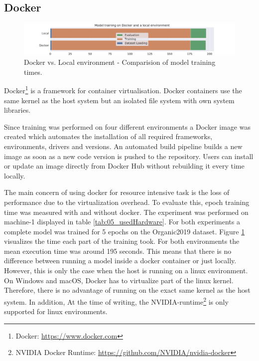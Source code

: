 \subsection{Docker}
\begin{figure}[ht]
	\centering
	\includegraphics[width=\textwidth]{figures/05_setup/05_dockerExecution}
	\caption{Docker vs. Local environment - Comparision of model training times.}
	\label{fig:05_dockerExecution}
\end{figure}

Docker\footnote{Docker: \url{https://www.docker.com}} is a framework for container virtualisation. Docker containers use the same kernel as the host system but an isolated file system with own system libraries. 
\medskip

Since training was performed on four different environments a Docker image was created which automates the installation of all required frameworks, environments, drivers and versions. An automated build pipeline builds a new image as soon as a new code version is pushed to the repository. Users can install or update an image directly from Docker Hub without rebuilding it every time locally.
\medskip

The main concern of using docker for resource intensive task is the loss of performance due to the virtualization overhead. To evaluate this, epoch training time was measured with and without docker. The experiment was performed on machine-1 displayed in table \ref{tab:05_usedHardware}. For both experiments a complete model was trained for 5 epochs on the Organic2019 dataset. Figure \ref{fig:05_dockerExecution} visualizes the time each part of the training took. For both environments the mean execution time was around 195 seconds. This means that there is no difference between running a model inside a docker container or just locally. However, this is only the case when the host is running on a linux environment. On Windows and macOS, Docker has to virtualize part of the linux kernel. Therefore, there is no advantage of running on the exact same kernel as the host system. In addition, At the time of writing, the NVIDIA-runtime\footnote{NVIDIA Docker Runtime: \url{https://github.com/NVIDIA/nvidia-docker}} is only supported for linux environments.






